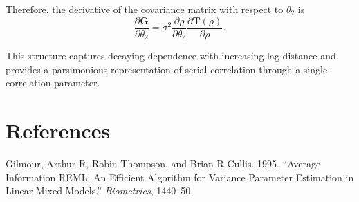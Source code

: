 \documentclass[
  letterpaper,
  DIV=11,
  numbers=noendperiod]{scrartcl}
\newlength{\cslhangindent}
\newenvironment{CSLReferences}[2] %
 {\begin{list}{}{%
  \setlength{\itemindent}{0pt}
  \setlength{\leftmargin}{0pt}
  \setlength{\parsep}{0pt}
  \ifodd #1
   \setlength{\leftmargin}{\cslhangindent}
   \setlength{\itemindent}{-1\cslhangindent}
  \fi
  \setlength{\itemsep}{#2\baselineskip}}}
 {\end{list}}
\begin{document}
Therefore, the derivative of the covariance matrix with respect to
\(\theta_2\) is \begin{equation}
\frac{\partial \symbf{G}}{\partial \theta_2}
= \sigma^2 \frac{\partial \rho}{\partial \theta_2}
\frac{\partial \symbf{T}(\rho)}{\partial \rho}.
\end{equation}

This structure captures decaying dependence with increasing lag distance
and provides a parsimonious representation of serial correlation through
a single correlation parameter.

\clearpage

\section*{References}\label{references}

\label{refs}
\begin{CSLReferences}{1}{0}
Gilmour, Arthur R, Robin Thompson, and Brian R Cullis. 1995. {``Average
Information REML: An Efficient Algorithm for Variance Parameter
Estimation in Linear Mixed Models.''} \emph{Biometrics}, 1440--50.

\end{CSLReferences}
\end{document}
